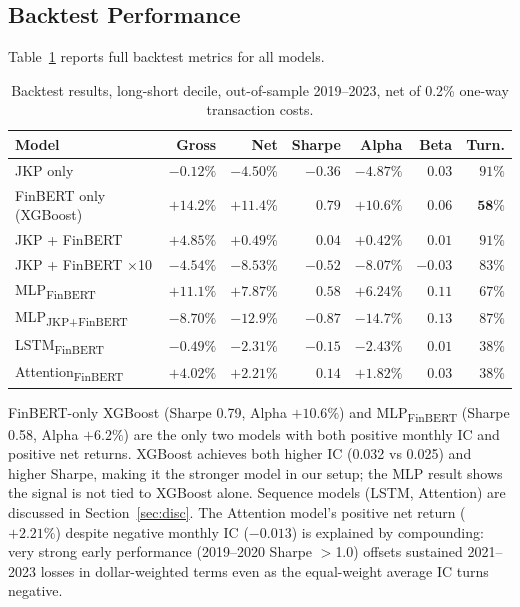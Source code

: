 \subsection{Backtest Performance}

Table~\ref{tab:backtest} reports full backtest metrics for all models.

\begin{table}[H]
\centering
\caption{Backtest results, long-short decile, out-of-sample 2019--2023, net of 0.2\% one-way transaction costs.}
\label{tab:backtest}
\setlength{\tabcolsep}{4pt}
\begin{tabular}{lrrrrrr}
\toprule
\textbf{Model} & \textbf{Gross} & \textbf{Net} & \textbf{Sharpe} & \textbf{Alpha} & \textbf{Beta} & \textbf{Turn.} \\
\midrule
JKP only                  & $-0.12\%$ & $-4.50\%$ & $-0.36$ & $-4.87\%$ & $0.03$ & $91\%$ \\
\rowcolor{lightgray}
FinBERT only (XGBoost)    & $\mathbf{+14.2\%}$ & $\mathbf{+11.4\%}$ & $\mathbf{0.79}$ & $\mathbf{+10.6\%}$ & $0.06$ & $\mathbf{58\%}$ \\
JKP + FinBERT             & $+4.85\%$ & $+0.49\%$ & $0.04$ & $+0.42\%$ & $0.01$ & $91\%$ \\
JKP + FinBERT $\times$10  & $-4.54\%$ & $-8.53\%$ & $-0.52$ & $-8.07\%$ & $-0.03$ & $83\%$ \\
\midrule
MLP\textsubscript{FinBERT}       & $+11.1\%$ & $+7.87\%$ & $0.58$ & $+6.24\%$ & $0.11$ & $67\%$ \\
MLP\textsubscript{JKP+FinBERT}   & $-8.70\%$ & $-12.9\%$ & $-0.87$ & $-14.7\%$ & $0.13$ & $87\%$ \\
LSTM\textsubscript{FinBERT}      & $-0.49\%$ & $-2.31\%$ & $-0.15$ & $-2.43\%$ & $0.01$ & $38\%$ \\
Attention\textsubscript{FinBERT} & $+4.02\%$ & $+2.21\%$ & $0.14$ & $+1.82\%$ & $0.03$ & $38\%$ \\
\bottomrule
\end{tabular}
\end{table}

FinBERT-only XGBoost (Sharpe 0.79, Alpha $+10.6\%$) and MLP\textsubscript{FinBERT} (Sharpe 0.58, Alpha $+6.2\%$) are the only two models with both positive monthly IC and positive net returns. XGBoost achieves both higher IC (0.032 vs 0.025) and higher Sharpe, making it the stronger model in our setup; the MLP result shows the signal is not tied to XGBoost alone. Sequence models (LSTM, Attention) are discussed in Section~\ref{sec:disc}. The Attention model's positive net return ($+2.21\%$) despite negative monthly IC ($-0.013$) is explained by compounding: very strong early performance (2019--2020 Sharpe $>$1.0) offsets sustained 2021--2023 losses in dollar-weighted terms even as the equal-weight average IC turns negative.

